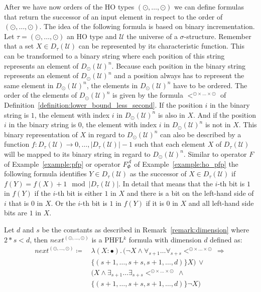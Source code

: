 After we have now orders of the HO types $(\odot, \dots, \odot)$ we can define formulas that return the successor of
an input element in respect to the order of $(\odot, \dots, \odot)$. The idea of the following formula is based on
binary incrementation. Let $\tau = (\odot, \dots, \odot)$ an HO type and $\mathcal{U}$ the universe of a
$\sigma$-structure. Remember that a set $X \in D_\tau(\mathcal{U})$ can be represented by its characteristic
function. This can be transformed to a binary string where each position of this string represents an element of
$D_{\odot}(\mathcal{U})^n$. Because each position in the binary string represents an element of $D_{\odot}
(\mathcal{U})^n$ and a position always has to represent the same element in $D_{\odot}(\mathcal{U})^n$, the elements
in $D_{\odot}(\mathcal{U})^n$ have to be ordered. The order of the elements of $D_{\odot}(\mathcal{U})^n$ is given by
the formula $<^{\odot \times \dots \times \odot}$ of Definition~\ref{definition:lower_bound_less_second}. If the position
$i$ in the binary string is $1$, the element with index $i$ in $D_{\odot}(\mathcal{U})^n$ is
also in $X$. And if the position $i$ in the binary string is $0$, the element with index $i$ in $D_{\odot}
(\mathcal{U})^n$ is not in $X$. This binary representation of $X$ in regard to $D_{\odot}
(\mathcal{U})^n$ can also be described by a function $f \colon D_\tau(\mathcal{U}) \rightarrow 
{0, \dots, |D_\tau(\mathcal{U})| - 1}$ such that
each element $X$ of $D_\tau(\mathcal{U})$ will be mapped to its binary string in regard to 
$D_{\odot}(\mathcal{U})^n$. Similar to operator $F$ of Example~\ref{example:pfp} or operator 
$F_\Phi^\mathcal{A}$ of Example~\ref{example:ho_pfp} the following formula identifies $Y \in 
D_\tau(\mathcal{U})$ as the successor of $X \in D_\tau(\mathcal{U})$ if $f(Y) = f(X) + 1 
\mod |D_\tau(\mathcal{U})|$. In detail that means that the $i$-th bit is $1$ in $f(Y)$ if 
the $i$-th bit is either $1$ in $X$ and there is a bit on the left-hand side of $i$ that is $0$ in 
$X$. Or the $i$-th bit is $1$ in $f(Y)$ if it is $0$ in $X$ and all left-hand side bits are $1$ in $X
$. 

\begin{definition}
    \label{definition:lower_bounds_next_second}
    Let $d$ and $s$ be the constants as described in Remark~\ref{remark:dimension} where $2*s < d$, then $next^{(\odot, \dots, \odot)}$
    is a PHFL$^k$ formula with dimension $d$ defined as:
    \begin{align*}
        next^{(\odot, \dots, \odot)} \coloneqq &\,\lambda (X \colon \bullet).\, (\neg X \wedge \forall_{s +
        1}\dots\forall_{s + s}<^{\odot \times \dots \times \odot}\, \Rightarrow \\&\,\{(s +
        1, \dots, s + s, s + 1, \dots, d)\} X) \,\vee \\&\,(X \wedge \exists_{s + 1}\dots\exists_{s + s} <^{\odot
        \times \dots \times \odot} \,\wedge \\&\,\{(s + 1, \dots, s + s, s + 1, \dots, d)\}
        \neg X)
    \end{align*}
\end{definition}

